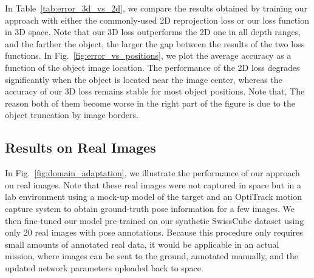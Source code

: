 In Table~\ref{tab:error_3d_vs_2d}, we compare the results obtained by training our approach with either the commonly-used 2D reprojection loss or our loss function in 3D space. Note that our 3D loss outperforms the 2D one in all depth ranges, and the farther the object, the larger the gap between the results of the two loss functions.
In Fig.~\ref{fig:error_vs_positions}, we plot the average accuracy as a function of the object image location. The performance of the 2D loss degrades significantly when the object is located near the image center, whereas the accuracy of our 3D loss remains stable for most object positions. Note that, The reason both of them become worse in the right part of the figure is due to the object truncation by image borders.

\subsection{Results on Real Images}

In Fig.~\ref{fig:domain_adaptation}, we illustrate the performance of our approach on real images. Note that these real images were not captured in space but in a lab environment using a mock-up model of the target and an OptiTrack motion capture system to obtain ground-truth pose information for a few images. We then fine-tuned our model pre-trained on our synthetic SwissCube dataset using only 20 real images with pose annotations. Because this procedure only requires small amounts of annotated real data, it would be applicable in an actual mission, where images can be sent to the ground, annotated manually, and the updated network parameters uploaded back to space.

